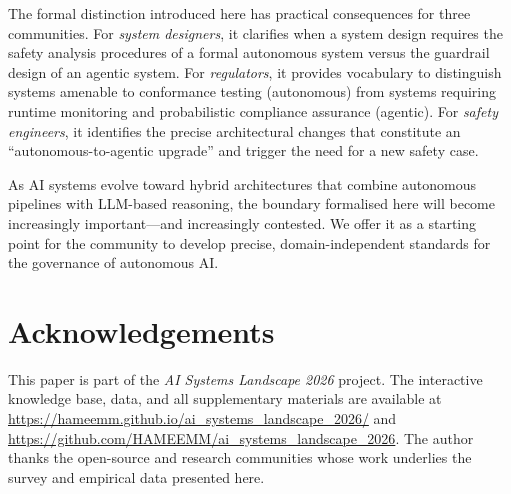 \documentclass[12pt, a4paper]{article}
\begin{document}
The formal distinction introduced here has practical consequences for three communities. For \emph{system designers}, it clarifies when a system design requires the safety analysis procedures of a formal autonomous system versus the guardrail design of an agentic system. For \emph{regulators}, it provides vocabulary to distinguish systems amenable to conformance testing (autonomous) from systems requiring runtime monitoring and probabilistic compliance assurance (agentic). For \emph{safety engineers}, it identifies the precise architectural changes that constitute an ``autonomous-to-agentic upgrade'' and trigger the need for a new safety case.

As AI systems evolve toward hybrid architectures that combine autonomous pipelines with LLM-based reasoning, the boundary formalised here will become increasingly important---and increasingly contested. We offer it as a starting point for the community to develop precise, domain-independent standards for the governance of autonomous AI.

\section*{Acknowledgements}
This paper is part of the \emph{AI Systems Landscape 2026} project. The interactive knowledge base, data, and all supplementary materials are available at \url{https://hameemm.github.io/ai_systems_landscape_2026/} and \url{https://github.com/HAMEEMM/ai_systems_landscape_2026}. The author thanks the open-source and research communities whose work underlies the survey and empirical data presented here.


\end{document}
